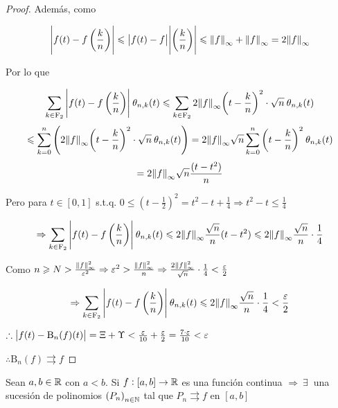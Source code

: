 \begin{proof}
    Además, como 

    $$\abs{f(t)-f \left( \frac{k}{n} \right) } \leqslant \abs{f(t)-f} \abs{\left( \frac{k}{n} \right)} \leqslant {\norm{f}}_{\infty} + {\norm{f}}_{\infty} = 2{\norm{f}}_{\infty}$$

    Por lo que

    $$\sum\limits_{k\in \mathrm{F}_2}  \abs{f(t)-f \left( \frac{k}{n} \right) } \: {\theta}_{n,k} (t) \leqslant \sum\limits_{k\in \mathrm{F}_2} 2{\norm{f}}_{\infty} {\left( t- \frac{k}{n} \right)}^{2} \cdot \sqrt{n}  \: {\theta}_{n,k} (t) $$
    $$\leqslant \sum\limits_{k=0}^{n} \left( 2{\norm{f}}_{\infty} {\left( t- \frac{k}{n} \right)}^{2} \cdot \sqrt{n}  \: {\theta}_{n,k} (t) \right) = 2{\norm{f}}_{\infty} \sqrt{n}  \sum\limits_{k=0}^{n} {\left( t- \frac{k}{n} \right)}^{2}  \: {\theta}_{n,k} (t)$$
    $$=  2{\norm{f}}_{\infty} \sqrt{n}  \frac{(t-t^2)}{n}$$

    Pero para $t \in [0,1]$ s.t.q. $0 \leqslant {\left( t - \frac{1}{2} \right)}^{2} = t^2-t + \frac{1}{4} \Rightarrow t^2-t \leqslant \frac{1}{4}$

    $$\Rightarrow \sum\limits_{k\in \mathrm{F}_2}  \abs{f(t)-f \left( \frac{k}{n} \right) } \: {\theta}_{n,k} (t) \leqslant 2{\norm{f}}_{\infty} \frac{\sqrt{n}}{n} (t-t^2) \leqslant 2{\norm{f}}_{\infty}  \frac{\sqrt{n}}{n} \cdot \frac{1}{4}$$

    Como $n \geqslant N > \frac{{\norm{f}}^{2}_{\infty}}{\varepsilon^2} \Rightarrow \varepsilon^2 > \frac{{\norm{f}}^{2}_{\infty}}{n} \Rightarrow \frac{2{\norm{f}}^{2}_{\infty}}{\sqrt{n}} \cdot \frac{1}{4} < \frac{\varepsilon}{2}$

    $$\Rightarrow \sum\limits_{k\in \mathrm{F}_2}  \abs{f(t)-f \left( \frac{k}{n} \right) } \: {\theta}_{n,k} (t) \leqslant 2{\norm{f}}_{\infty}  \frac{\sqrt{n}}{n} \cdot \frac{1}{4} < \frac{\varepsilon}{2}$$

    $\therefore \abs{f(t)-\mathrm{B}_n(f)(t)} = \Xi + \Upsilon < \frac{\varepsilon}{10} + \frac{\varepsilon}{2} = \frac{7 \cdot \varepsilon}{10} < \varepsilon$

    $\therefore \mathrm{B}_n(f) \rightrightarrows f$
\end{proof}

\begin{theorem}  \label{theom532}
    Sean $a, b \in \mathbb{R}$ con $a < b$. Si $f :[a,b] \to \mathbb{R}$ es una función continua $\Rightarrow \: \exists \:$ una sucesión de polinomios ${\left(P_n\right)}_{n \in \mathbb{N}}$ tal que $P_n \rightrightarrows f$ en $[a,b]$
\end{theorem}

